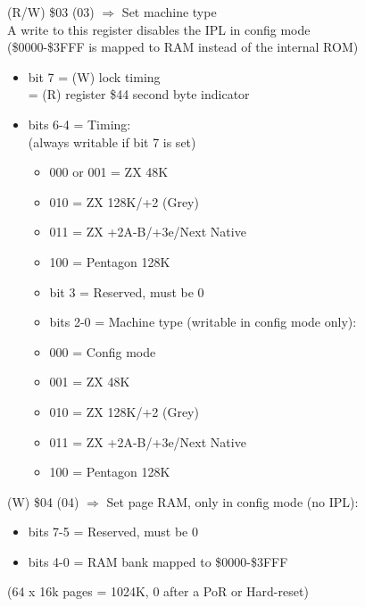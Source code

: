 (R/W) \$03 (03) $\Rightarrow$ Set machine type\\
A write to this register disables the IPL in config mode\\
(\$0000-\$3FFF is mapped to RAM instead of the internal ROM)
\begin{itemize}
\item[] bit 7 = (W) lock timing\\
  = (R) register \$44 second byte indicator
\item[] bits 6-4 = Timing:\\
  (always writable if bit 7 is set)
  \begin{itemize}
  \item[] 000 or 001 = ZX 48K
  \item[] 010 = ZX 128K/+2 (Grey)
  \item[] 011 = ZX +2A-B/+3e/Next Native
  \item[] 100 = Pentagon 128K
  \item[] bit 3 = Reserved, must be 0
  \item[] bits 2-0 = Machine type (writable in config mode only):
  \item[] 000 = Config mode
  \item[] 001 = ZX 48K
  \item[] 010 = ZX 128K/+2 (Grey)
  \item[] 011 = ZX +2A-B/+3e/Next Native
  \item[] 100 = Pentagon 128K
  \end{itemize}
\end{itemize}

(W) \$04 (04) $\Rightarrow$ Set page RAM, only in config mode (no IPL):
\begin{itemize}
\item[] bits 7-5 = Reserved, must be 0
\item[] bits 4-0 = RAM bank mapped to \$0000-\$3FFF
\end{itemize}
(64 x 16k pages = 1024K, 0 after a PoR or Hard-reset)

